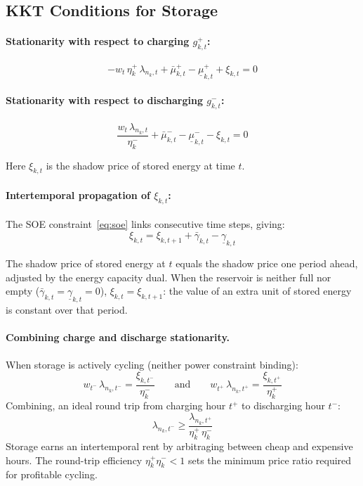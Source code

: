 \documentclass{article}
\begin{document}
\subsection{KKT Conditions for Storage}
\label{sec:storage_kkt}

\paragraph{Stationarity with respect to charging $g^+_{k,t}$:}
\begin{equation}
    -w_t\, \eta^+_k\, \lambda_{n_k,t} + \bar{\mu}^+_{k,t}
    - \underline{\mu}^+_{k,t} + \xi_{k,t} = 0
    \label{eq:stat_charge}
\end{equation}

\paragraph{Stationarity with respect to discharging $g^-_{k,t}$:}
\begin{equation}
    \frac{w_t\, \lambda_{n_k,t}}{\eta^-_k}
    + \bar{\mu}^-_{k,t} - \underline{\mu}^-_{k,t} - \xi_{k,t} = 0
    \label{eq:stat_discharge}
\end{equation}

Here $\xi_{k,t}$ is the shadow price of stored energy at time $t$.

\paragraph{Intertemporal propagation of $\xi_{k,t}$:}
The SOE constraint~\eqref{eq:soe} links consecutive time steps, giving:
\begin{equation}
    \xi_{k,t} = \xi_{k,t+1} + \bar{\gamma}_{k,t} - \underline{\gamma}_{k,t}
    \label{eq:xi_propagation}
\end{equation}

The shadow price of stored energy at $t$ equals the shadow price one period
ahead, adjusted by the energy capacity dual. When the reservoir is neither
full nor empty ($\bar{\gamma}_{k,t} = \underline{\gamma}_{k,t} = 0$),
$\xi_{k,t} = \xi_{k,t+1}$: the value of an extra unit of stored energy is
constant over that period.

\paragraph{Combining charge and discharge stationarity.}
When storage is actively cycling (neither power constraint binding):
\begin{equation}
    w_{t^-}\, \lambda_{n_k,t^-}
    = \frac{\xi_{k,t^-}}{\eta^-_k}
    \qquad \text{and} \qquad
    w_{t^+}\, \lambda_{n_k,t^+}
    = \frac{\xi_{k,t^+}}{\eta^+_k}
\end{equation}
Combining, an ideal round trip from charging hour $t^+$ to discharging hour $t^-$:
\begin{equation}
    \lambda_{n_k,t^-} \ge \frac{\lambda_{n_k,t^+}}{\eta^+_k\,\eta^-_k}
    \label{eq:arbitrage}
\end{equation}
Storage earns an intertemporal rent by arbitraging between cheap and expensive
hours. The round-trip efficiency $\eta^+_k \eta^-_k < 1$ sets the minimum price
ratio required for profitable cycling.
\end{document}
